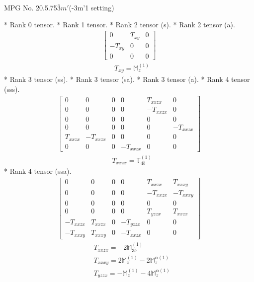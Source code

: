 \documentclass[fleqn,8pt,landscape]{jsarticle}
\begin{document}
\setcounter{MaxMatrixCols}{32}

\renewcommand{\tablename}{Table~}
\renewcommand{\figurename}{Figure~}
\begin{center}
\LARGE
MPG No. 20.5.75\quad$\bar{3}m'$\quad(-3m'1 setting)
\end{center}
* Rank 0 tensor.
* Rank 1 tensor.
* Rank 2 tensor (s).
* Rank 2 tensor (a).
\begin{align*}
\begin{bmatrix} 0 & T_{xy} & 0 \\ - T_{xy} & 0 & 0 \\ 0 & 0 & 0 \end{bmatrix}
\end{align*}
\begin{align*}
& T_{xy} = \mathbb{M}_{z}^{(1)}
\end{align*}
* Rank 3 tensor (ss).
* Rank 3 tensor (sa).
* Rank 3 tensor (a).
* Rank 4 tensor (sss).
\begin{align*}
\begin{bmatrix} 0 & 0 & 0 & 0 & T_{xxzx} & 0 \\ 0 & 0 & 0 & 0 & - T_{xxzx} & 0 \\ 0 & 0 & 0 & 0 & 0 & 0 \\ 0 & 0 & 0 & 0 & 0 & - T_{xxzx} \\ T_{xxzx} & - T_{xxzx} & 0 & 0 & 0 & 0 \\ 0 & 0 & 0 & - T_{xxzx} & 0 & 0 \end{bmatrix}
\end{align*}
\begin{align*}
& T_{xxzx} = \mathbb{T}_{4b}^{(1)}
\end{align*}
* Rank 4 tensor (ssa).
\begin{align*}
\begin{bmatrix} 0 & 0 & 0 & 0 & T_{xxzx} & T_{xxxy} \\ 0 & 0 & 0 & 0 & - T_{xxzx} & - T_{xxxy} \\ 0 & 0 & 0 & 0 & 0 & 0 \\ 0 & 0 & 0 & 0 & T_{yzzx} & T_{xxzx} \\ - T_{xxzx} & T_{xxzx} & 0 & - T_{yzzx} & 0 & 0 \\ - T_{xxxy} & T_{xxxy} & 0 & - T_{xxzx} & 0 & 0 \end{bmatrix}
\end{align*}
\begin{align*}
& T_{xxzx} = - 2 \mathbb{M}_{3b}^{(1)} \\
& T_{xxxy} = 2 \mathbb{M}_{z}^{(1)} - 2 \mathbb{M}_{z}^{\alpha(1)} \\
& T_{yzzx} = - \mathbb{M}_{z}^{(1)} - 4 \mathbb{M}_{z}^{\alpha(1)}
\end{align*}
\end{document}
